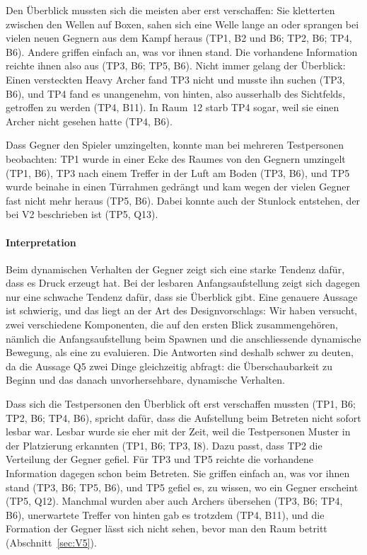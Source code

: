\documentclass[../Main.tex]{subfiles}
\begin{document}
Den Überblick mussten sich die meisten aber erst verschaffen: Sie kletterten zwischen den Wellen auf Boxen, sahen sich eine Welle lange an oder sprangen bei vielen neuen Gegnern aus dem Kampf heraus (TP1, B2 und B6; TP2, B6; TP4, B6). Andere griffen einfach an, was vor ihnen stand. Die vorhandene Information reichte ihnen also aus (TP3, B6; TP5, B6). Nicht immer gelang der Überblick: Einen versteckten Heavy Archer fand TP3 nicht und musste ihn suchen (TP3, B6), und TP4 fand es unangenehm, von hinten, also ausserhalb des Sichtfelds, getroffen zu werden (TP4, B11). In Raum~12 starb TP4 sogar, weil sie einen Archer nicht gesehen hatte (TP4, B6).

Dass Gegner den Spieler umzingelten, konnte man bei mehreren Testpersonen beobachten: TP1 wurde in einer Ecke des Raumes von den Gegnern umzingelt (TP1, B6), TP3 nach einem Treffer in der Luft am Boden (TP3, B6), und TP5 wurde beinahe in einen Türrahmen gedrängt und kam wegen der vielen Gegner fast nicht mehr heraus (TP5, B6). Dabei konnte auch der Stunlock entstehen, der bei V2 beschrieben ist (TP5, Q13).

\paragraph{Interpretation}
Beim dynamischen Verhalten der Gegner zeigt sich eine starke Tendenz dafür, dass es Druck erzeugt hat. Bei der lesbaren Anfangsaufstellung zeigt sich dagegen nur eine schwache Tendenz dafür, dass sie Überblick gibt. Eine genauere Aussage ist schwierig, und das liegt an der Art des Designvorschlags: Wir haben versucht, zwei verschiedene Komponenten, die auf den ersten Blick zusammengehören, nämlich die Anfangsaufstellung beim Spawnen und die anschliessende dynamische Bewegung, als eine zu evaluieren. Die Antworten sind deshalb schwer zu deuten, da die Aussage Q5 zwei Dinge gleichzeitig abfragt: die Überschaubarkeit zu Beginn und das danach unvorhersehbare, dynamische Verhalten.

Dass sich die Testpersonen den Überblick oft erst verschaffen mussten (TP1, B6; TP2, B6; TP4, B6), spricht dafür, dass die Aufstellung beim Betreten nicht sofort lesbar war. Lesbar wurde sie eher mit der Zeit, weil die Testpersonen Muster in der Platzierung erkannten (TP1, B6; TP3, I8). Dazu passt, dass TP2 die Verteilung der Gegner gefiel. Für TP3 und TP5 reichte die vorhandene Information dagegen schon beim Betreten. Sie griffen einfach an, was vor ihnen stand (TP3, B6; TP5, B6), und TP5 gefiel es, zu wissen, wo ein Gegner erscheint (TP5, Q12). Manchmal wurden aber auch Archers übersehen (TP3, B6; TP4, B6), unerwartete Treffer von hinten gab es trotzdem (TP4, B11), und die Formation der Gegner lässt sich nicht sehen, bevor man den Raum betritt (Abschnitt~\ref{sec:V5}).
\end{document}
